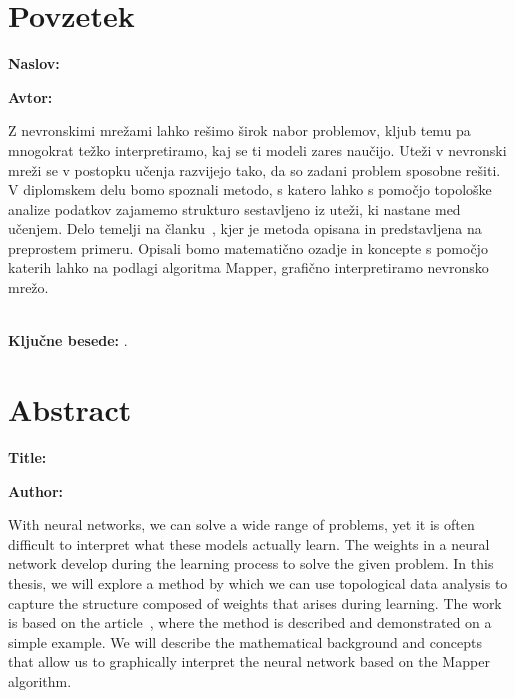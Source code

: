 \clearemptydoublepage{}

\chapter*{Povzetek}

\noindent\textbf{Naslov:} \ttitle{}
\bigskip

\noindent\textbf{Avtor:} \tauthor{}
\bigskip

\noindent Z nevronskimi mrežami lahko rešimo širok nabor problemov, kljub temu pa mnogokrat težko interpretiramo, kaj se ti modeli zares naučijo. Uteži v nevronski mreži se v postopku učenja razvijejo tako, da so zadani problem sposobne rešiti. V diplomskem delu bomo spoznali metodo, s katero lahko s pomočjo topološke analize podatkov zajamemo strukturo sestavljeno iz uteži, ki nastane med učenjem. Delo temelji na članku~\cite{Gabella_2021}, kjer je metoda opisana in predstavljena na preprostem primeru. Opisali bomo matematično ozadje in koncepte s pomočjo katerih lahko na podlagi algoritma Mapper, grafično interpretiramo nevronsko mrežo.  \\ \\


\bigskip

\noindent\textbf{Ključne besede:} \tkeywords.
\clearemptydoublepage{}

\chapter*{Abstract}

\noindent\textbf{Title:} \ttitleEn{}
\bigskip

\noindent\textbf{Author:} \tauthor{}
\bigskip

\noindent With neural networks, we can solve a wide range of problems, yet it is often difficult to interpret what these models actually learn. The weights in a neural network develop during the learning process to solve the given problem. In this thesis, we will explore a method by which we can use topological data analysis to capture the structure composed of weights that arises during learning. The work is based on the article~\cite{Gabella_2021}, where the method is described and demonstrated on a simple example. We will describe the mathematical background and concepts that allow us to graphically interpret the neural network based on the Mapper algorithm.
\bigskip

